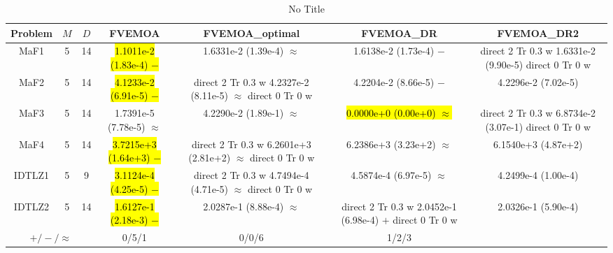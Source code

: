 \documentclass[journal]{IEEEtran}
\newcommand{\semitextbf}[1]{%
\pdfliteral direct {2 Tr 0.3 w} %
#1%
\pdfliteral direct {0 Tr 0 w}%
}
\begin{document}
\begin{table*}[htbp]
\renewcommand{\arraystretch}{1.2}
\centering
\caption{No Title}
\begin{tabular}{ccccccc}
\toprule
Problem&$M$&$D$&FVEMOA&FVEMOA\_optimal&FVEMOA\_DR&FVEMOA\_DR2\\
\midrule
\multirow{1}{*}{MaF1}&5&14&\hl{1.1011e-2 (1.83e-4) $-$}&1.6331e-2 (1.39e-4) $\approx$&1.6138e-2 (1.73e-4) $-$&\semitextbf{1.6331e-2 (9.90e-5)}\\
\hline
\multirow{1}{*}{MaF2}&5&14&\hl{4.1233e-2 (6.91e-5) $-$}&\semitextbf{4.2327e-2 (8.11e-5) $\approx$}&4.2204e-2 (8.66e-5) $-$&4.2296e-2 (7.02e-5)\\
\hline
\multirow{1}{*}{MaF3}&5&14&1.7391e-5 (7.78e-5) $\approx$&4.2290e-2 (1.89e-1) $\approx$&\hl{0.0000e+0 (0.00e+0) $\approx$}&\semitextbf{6.8734e-2 (3.07e-1)}\\
\hline
\multirow{1}{*}{MaF4}&5&14&\hl{3.7215e+3 (1.64e+3) $-$}&\semitextbf{6.2601e+3 (2.81e+2) $\approx$}&6.2386e+3 (3.23e+2) $\approx$&6.1540e+3 (4.87e+2)\\
\hline
\multirow{1}{*}{IDTLZ1}&5&9&\hl{3.1124e-4 (4.25e-5) $-$}&\semitextbf{4.7494e-4 (4.71e-5) $\approx$}&4.5874e-4 (6.97e-5) $\approx$&4.2499e-4 (1.00e-4)\\
\hline
\multirow{1}{*}{IDTLZ2}&5&14&\hl{1.6127e-1 (2.18e-3) $-$}&2.0287e-1 (8.88e-4) $\approx$&\semitextbf{2.0452e-1 (6.98e-4) $+$}&2.0326e-1 (5.90e-4)\\
\hline
\multicolumn{3}{c}{$+/-/\approx$}&0/5/1&0/0/6&1/2/3&\\
\bottomrule
\end{tabular}
\label{No Label}
\end{table*}
\end{document}
